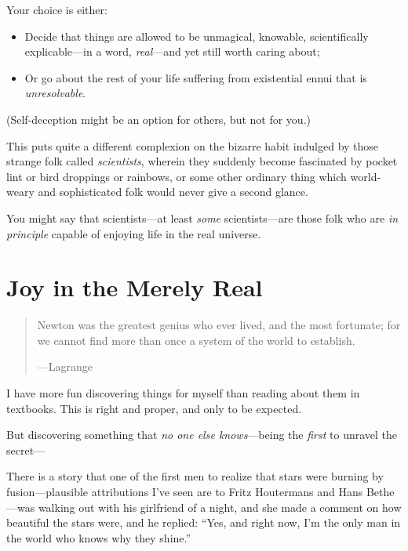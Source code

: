 {
 Your choice is either:}

\begin{itemize}
\item {
 Decide that things are allowed to be unmagical, knowable,
scientifically explicable---in a word, \textit{real}{}---and yet still
worth caring about;}

\item {
 Or go about the rest of your life suffering from existential ennui
 that is \textit{unresolvable}.}
\end{itemize}

{
 (Self-deception might be an option for others, but not for you.)}

{
 This puts quite a different complexion on the bizarre habit
indulged by those strange folk called \textit{scientists}, wherein they
suddenly become fascinated by pocket lint or bird droppings or
rainbows, or some other ordinary thing which world-weary and
sophisticated folk would never give a second glance.}

{
 You might say that scientists---at least \textit{some}
scientists---are those folk who are \textit{in principle} capable of
enjoying life in the real universe.}

\myendsectiontext

\chapter{Joy in the Merely Real}


\begin{quote}
{
 Newton was the greatest genius who ever lived, and the most
fortunate; for we cannot find more than once a system of the world to
establish.}

{\raggedleft
 {}---Lagrange
\par}
\end{quote}

{
 I have more fun discovering things for myself than reading about
them in textbooks. This is right and proper, and only to be expected.}

{
 But discovering something that \textit{no one else
knows}{}---being the \textit{first} to unravel the secret---}

{
 There is a story that one of the first men to realize that stars
were burning by fusion---plausible attributions I've
seen are to Fritz Houtermans and Hans Bethe{}---was walking out with
his girlfriend of a night, and she made a comment on how beautiful the
stars were, and he replied: ``Yes, and right now,
I'm the only man in the world who knows why they
shine.''}

